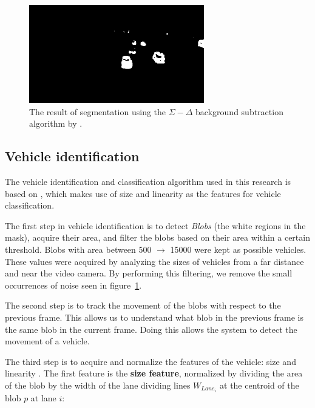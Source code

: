 \documentclass[conference]{IEEEtran}
\begin{document}
\begin{figure}[!ht]
\centering
\includegraphics[width=3in]{segmented_mask_sample.png}
\caption{The result of segmentation using the $\Sigma-\Delta$ background subtraction algorithm by \cite{Manzanera}.}
\label{fig_segmentation}
\end{figure}

\subsection{Vehicle identification}

The vehicle identification and classification algorithm used in this research is based on \cite{Jun-Wei}, which makes use of size and linearity as the features for vehicle classification.



The first step in vehicle identification is to detect \textit{Blobs} (the white regions in the mask), acquire their area, and filter the blobs based on their area within a certain threshold. Blobs with area between 500 $\rightarrow$ 15000 were kept as possible vehicles. These values were acquired by analyzing the sizes of vehicles from a far distance and near the video camera. By performing this filtering, we remove the small occurrences of noise seen in figure~\ref{fig_segmentation}.

The second step is to track the movement of the blobs with respect to the previous frame. This allows us to understand what blob in the previous frame is the same blob in the current frame. Doing this allows the system to detect the movement of a vehicle.

The third step is to acquire and normalize the features of the vehicle: size and linearity \cite{Sobral}. The first feature is the \textbf{size feature}, normalized by dividing the area of the blob by the width of the lane dividing lines $W_{Lane_{i}}$ at the centroid of the blob $p$ at lane $i$:
\end{document}
